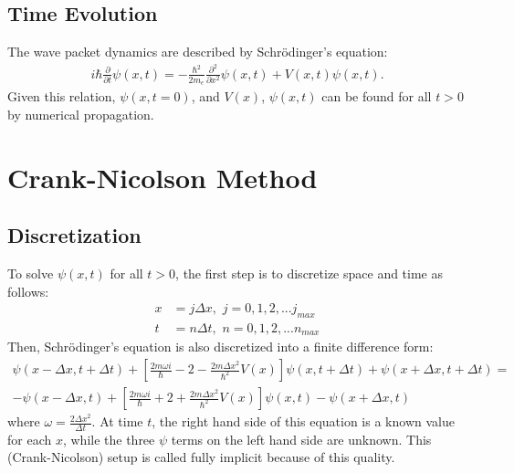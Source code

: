 \documentclass[12pt]{article}
\newcommand{\secpd}[1]{\frac{\partial^2}{\partial #1^2}}
\newcommand{\pd}[1]{\frac{\partial}{\partial #1}}
\newcommand{\dx}{\Delta x}
\newcommand{\dt}{\Delta t}
\begin{document}
\subsection{Time Evolution}
The wave packet dynamics are described by Schr\"{o}dinger's equation:
\begin{align*}
i\hbar \pd{t}\psi(x, t) =
-\frac{\hbar^2}{2m_e} \secpd{x} \psi(x, t) + V(x, t) \psi(x, t).
\end{align*}
Given this relation, $\psi(x, t = 0)$, and $V(x)$, $\psi(x, t)$ can be found for all $t > 0$ by numerical propagation.
\section{Crank-Nicolson Method}
\subsection{Discretization}
To solve $\psi(x, t)$ for all $t > 0$, the first step is to discretize space and time as follows:
\begin{align*}
x &= j\dx,\,\, j = 0, 1, 2, ... j_{max} \\
t &= n\dt,\,\, n = 0, 1, 2, ... n_{max}
\end{align*}
Then, Schr\"{o}dinger's equation is also discretized into a finite difference form:
\begin{align*}
\psi(x - \dx, t + \dt)
+ \left[
    \frac{2m\omega i}{\hbar} - 2 - \frac{2m\dx^2}{\hbar^2} V(x)
\right] \psi(x, t + \dt)
+ \psi(x + \dx, t + \dt)
= \\ - \psi(x - \dx, t)
+ \left[
    \frac{2m\omega i}{\hbar} + 2 + \frac{2m\dx^2}{\hbar^2}V(x)
\right] \psi(x, t)
- \psi(x + \dx, t)
\end{align*}
where $\omega = \frac{2 \dx^2}{\dt}$. At time $t$, the right hand side of this equation is a known value for each $x$, while the three $\psi$ terms on the left hand side are unknown. This (Crank-Nicolson) setup is called fully implicit because of this quality.
\end{document}
